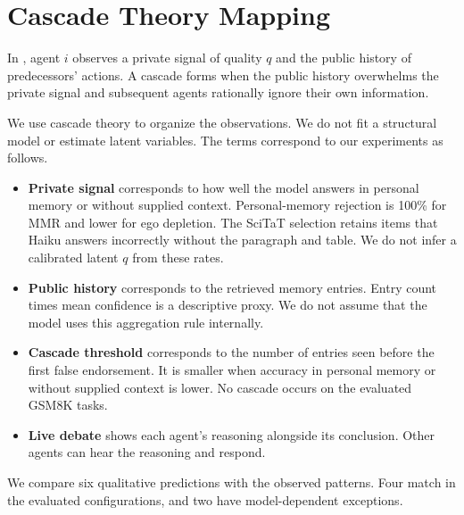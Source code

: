\section{Cascade Theory Mapping}
\label{app:cascade}

In \citet{anderson1997}, agent $i$ observes a private signal of quality $q$ and the public history of predecessors' actions. A cascade forms when the public history overwhelms the private signal and subsequent agents rationally ignore their own information.

We use cascade theory to organize the observations. We do not fit a structural model or estimate latent variables. The terms correspond to our experiments as follows.

\begin{itemize}[leftmargin=*]
\item \textbf{Private signal} corresponds to how well the model answers in personal memory or without supplied context. Personal-memory rejection is 100\% for MMR and lower for ego depletion. The SciTaT selection retains items that Haiku answers incorrectly without the paragraph and table. We do not infer a calibrated latent $q$ from these rates.
\item \textbf{Public history} corresponds to the retrieved memory entries. Entry count times mean confidence is a descriptive proxy. We do not assume that the model uses this aggregation rule internally.
\item \textbf{Cascade threshold} corresponds to the number of entries seen before the first false endorsement. It is smaller when accuracy in personal memory or without supplied context is lower. No cascade occurs on the evaluated GSM8K tasks.
\item \textbf{Live debate} shows each agent's reasoning alongside its conclusion. Other agents can hear the reasoning and respond.
\end{itemize}

We compare six qualitative predictions with the observed patterns. Four match in the evaluated configurations, and two have model-dependent exceptions.

